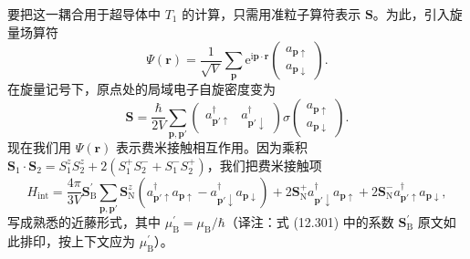 要把这一耦合用于超导体中 $T_{1}$ 的计算，只需用准粒子算符表示 $\mathbf{S}$。为此，引入旋量场算符
\begin{equation*}
\Psi(\mathbf{r})=\frac{1}{\sqrt{V}}\sum_{\mathbf{p}}\mathrm{e}^{\mathrm{i}\mathbf{p}\cdot\mathbf{r}}\begin{pmatrix}a_{\mathbf{p}\uparrow}\\ a_{\mathbf{p}\downarrow}\end{pmatrix}.\tag{12.299}
\end{equation*}
在旋量记号下，原点处的局域电子自旋密度变为
\begin{equation*}
\mathbf{S}=\frac{\hbar}{2V}\sum_{\mathbf{p},\mathbf{p}'}\begin{pmatrix}a_{\mathbf{p}'\uparrow}^{\dagger} & a_{\mathbf{p}'\downarrow}^{\dagger}\end{pmatrix}\sigma\begin{pmatrix}a_{\mathbf{p}\uparrow}\\ a_{\mathbf{p}\downarrow}\end{pmatrix}.\tag{12.300}
\end{equation*}
现在我们用 $\Psi(\mathbf{r})$ 表示费米接触相互作用。因为乘积 $\mathbf{S}_{1}\cdot\mathbf{S}_{2}=S_{1}^{z}S_{2}^{z}+2\left(S_{1}^{+}S_{2}^{-}+S_{1}^{-}S_{2}^{+}\right)$，我们把费米接触项
\begin{equation*}
H_{\mathrm{int}}=\frac{4\pi}{3V}\mathbf{S}_{\mathrm{B}}^{\prime}\sum_{\mathbf{p},\mathbf{p}'}\mathbf{S}_{\mathrm{N}}^{z}\left(a_{\mathbf{p}'\uparrow}^{\dagger}a_{\mathbf{p}\uparrow}-a_{\mathbf{p}'\downarrow}^{\dagger}a_{\mathbf{p}\downarrow}\right)+2\mathbf{S}_{\mathrm{N}}^{+}a_{\mathbf{p}'\downarrow}^{\dagger}a_{\mathbf{p}\uparrow}+2\mathbf{S}_{\mathrm{N}}^{-}a_{\mathbf{p}'\uparrow}^{\dagger}a_{\mathbf{p}\downarrow},\tag{12.301}
\end{equation*}
写成熟悉的近藤形式，其中 $\mu_{\mathrm{B}}^{\prime}=\mu_{\mathrm{B}}/\hbar$（译注：式 (12.301) 中的系数 $\mathbf{S}_{\mathrm{B}}^{\prime}$ 原文如此排印，按上下文应为 $\mu_{\mathrm{B}}^{\prime}$）。

